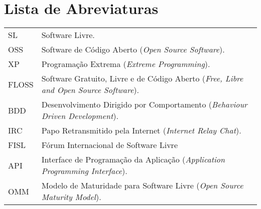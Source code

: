 \documentclass[11pt,twoside,a4paper]{book}
\begin{document}
\chapter{Lista de Abreviaturas}
\begin{tabular}{ll}
  SL       & Software Livre.\\
  OSS         & Software de Código Aberto (\emph{Open Source Software}).\\
  XP       & Programação Extrema (\emph{Extreme Programming}).\\
  FLOSS       & Software Gratuito, Livre e de Código Aberto (\emph{Free, Libre and Open Source
    Software}).\\
  BDD       & Desenvolvimento Dirigido por Comportamento (\emph{Behaviour Driven Development}).\\
  IRC       & Papo Retransmitido pela Internet (\emph{Internet Relay Chat}).\\
  FISL       & Fórum Internacional de Software Livre\\
  API       & Interface de Programação da Aplicação (\emph{Application Programming Interface}).\\ 
  OMM       & Modelo de Maturidade para Software Livre (\emph{Open Source Maturity Model}).\\
\end{tabular}


\listoffigures %

\mainmatter
\fancyhead[RE,LO]{\thesection}

\onehalfspacing %

\end{document}
